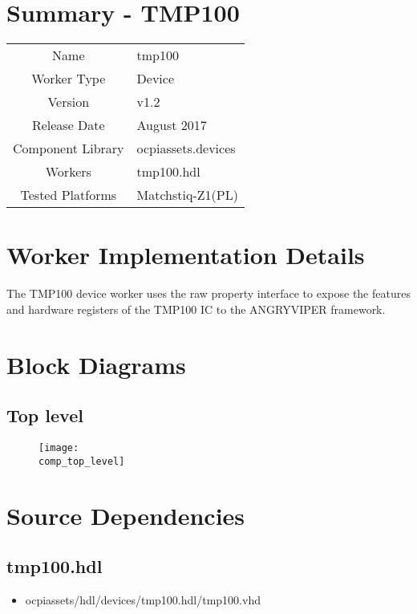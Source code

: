 \documentclass{article}
\author{} %
\date{Version \docVersion} %
\title{\docTitle}
\def\docVersion{1.2}
\def\comp{tmp100}
\def\Comp{TMP100}
\begin{document}
\section*{Summary - \Comp}
\begin{tabular}{|c|M{13.5cm}|}
	\hline
	                  &                                        \\
	\hline
	Name              & \comp                                  \\
	\hline
	Worker Type       & Device                                 \\
	\hline
	Version           & v\docVersion \\
	\hline
	Release Date      & August 2017 \\
	\hline
	Component Library & ocpiassets.devices                     \\
	\hline
	Workers           & \comp.hdl                              \\
	\hline
	Tested Platforms  & Matchstiq-Z1(PL)                       \\
	\hline
\end{tabular}

\section*{Worker Implementation Details}
The \Comp{} device worker uses the raw property interface to expose the features and hardware registers of the \Comp{} IC to the ANGRYVIPER framework.

\section*{Block Diagrams}
\subsection*{Top level}
\begin{figure}[ht]
	\centerline{\texttt{[image: \\comp\_top\_level]}}
	\label{fig:tb}
\end{figure}

\section*{Source Dependencies}
\subsection*{\comp.hdl}
\begin{itemize}
	\item ocpiassets/hdl/devices/\comp.hdl/\comp.vhd
\end{itemize}
\end{document}
